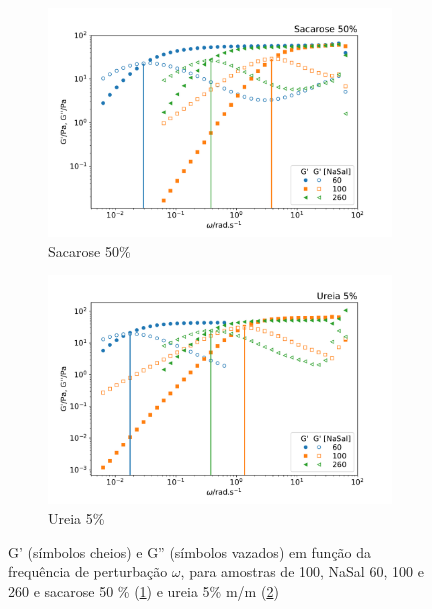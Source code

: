 	\begin{figure}[h]
		\begin{subfigure}[t]{0.5\textwidth}
			\centering
			\includegraphics[width=\textwidth]{imagens/reologia/oscilatorio_sac50p}
			\caption{Sacarose 50\%}
			\label{fig:oscilatorio_sac_50p}
		\end{subfigure} %
		\begin{subfigure}[t]{0.5\textwidth}
			\centering
			\includegraphics[width=\textwidth]{imagens/reologia/oscilatorio_ur5p}
			\caption{Ureia 5\%}
			\label{fig:oscilatorio_ur_5p}
		\end{subfigure} 
	\caption{G' (símbolos cheios) e G'' (símbolos vazados) em função da frequência de perturbação \(\omega\), para amostras de \CTAB{} 100\mM{}, NaSal 60, 100 e 260\mM{} e sacarose 50 \% (\ref{fig:oscilatorio_sac_50p}) e ureia 5\% m/m (\ref{fig:oscilatorio_ur_5p})}
	\label{fig:oscilatorio_ur_sacarose}
	\end{figure}

